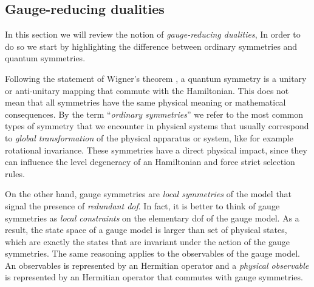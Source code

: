 \begin{figure}[t]
\end{figure}


%
%
\subsection{Gauge-reducing dualities}%
\label{sub:gauge_reducing_dualities}

In this section we will review the notion of \emph{gauge-reducing dualities},
In order to do so we start by highlighting the difference between ordinary symmetries and quantum symmetries.

Following the statement of Wigner's theorem \cite{wigner2012group}, a quantum symmetry is a unitary or anti-unitary mapping that commute with the Hamiltonian.
This does not mean that all symmetries have the same physical meaning or mathematical consequences.
By the term ``\emph{ordinary symmetries}'' we refer to the most common types of symmetry that we encounter in physical systems that usually correspond to \emph{global transformation} of the physical apparatus or system, like for example rotational invariance.
These symmetries have a direct physical impact, since they can influence the level degeneracy of an Hamiltonian and force strict selection rules.

On the other hand, gauge symmetries are \emph{local symmetries} of the model that signal the presence of \emph{redundant \ac{dof}}.
In fact, it is better to think of gauge symmetries as \emph{local constraints} on the elementary \ac{dof} of the gauge model.
As a result, the state space of a gauge model is larger than set of physical states, which are exactly the states that are invariant under the action of the gauge symmetries.
The same reasoning applies to the observables of the gauge model.
An observables is represented by an Hermitian operator and a \emph{physical observable} is represented by an Hermitian operator that commutes with gauge symmetries.

